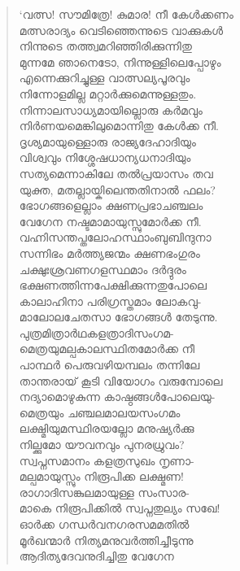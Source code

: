 \begin{verse}
‘വത്സ! സൗമിത്രേ! കുമാര! നീ കേള്‍ക്കണം\\
മത്സരാദ്യം വെടിഞ്ഞെന്നുടെ വാക്കുകള്‍\\
നിന്നുടെ തത്ത്വമറിഞ്ഞിരിക്കുന്നിതു\\
മുന്നമേ ഞാനെടോ, നിന്നുള്ളിലെപ്പോഴും\\
എന്നെക്കുറിച്ചുള്ള വാത്സല്യപൂരവും\\
നിന്നോളമില്ല മറ്റാര്‍ക്കുമെന്നുള്ളതും.\\
നിന്നാലസാധ്യമായില്ലൊരു കര്‍മവും\\
നിര്‍ണയമെങ്കിലുമൊന്നിതു കേള്‍ക്ക നീ.\\
ദൃശ്യമായുള്ളൊരു രാജ്യദേഹാദിയും\\
വിശ്വവും നിശ്ശേഷധാന്യധനാദിയും\\
സത്യമെന്നാകിലേ തല്‍പ്രയാസം തവ\\
യുക്ത, മതല്ലായ്കിലെന്തതിനാല്‍ ഫലം?\\
ഭോഗങ്ങളെല്ലാം ക്ഷണപ്രഭാചഞ്ചലം\\
വേഗേന നഷ്ടമാമായുസ്സുമോര്‍ക്ക നീ.\\
വഹ്നിസന്തപ്തലോഹസ്ഥാംബുബിന്ദുനാ\\
സന്നിഭം മര്‍ത്ത്യജന്മം ക്ഷണഭംഗുരം\\
ചക്ഷുഃശ്രവണഗളസ്ഥമാം ദര്‍ദ്ദുരം\\
ഭക്ഷണത്തിന്നപേക്ഷിക്കുന്നതുപോലെ\\
കാലാഹിനാ പരിഗ്രസ്തമാം ലോകവു-\\
മാലോലചേതസാ ഭോഗങ്ങള്‍ തേടുന്നു.\\
പുത്രമിത്രാര്‍ഥകളത്രാദിസംഗമ-\\
മെത്രയുമല്പകാലസ്ഥിതമോര്‍ക്ക നീ\\
പാന്ഥര്‍ പെരുവഴിയമ്പലം തന്നിലേ\\
താന്തരായ് കൂടി വിയോഗം വരുമ്പോലെ\\
നദ്യാമൊഴുകുന്ന കാഷ്ഠങ്ങള്‍പോലെയു-\\
മെത്രയും ചഞ്ചലമാലയസംഗമം\\
ലക്ഷ്മിയുമസ്ഥിരയല്ലോ മനുഷ്യര്‍ക്കു\\
നില്ക്കുമോ യൗവനവും പുനരധ്രുവം?\\
സ്വപ്നസമാനം കളത്രസുഖം നൃണാ-\\
മല്പമായുസ്സും നിരൂപിക്ക ലക്ഷ്മണ!\\
രാഗാദിസങ്കുലമായുള്ള സംസാര-\\
മാകെ നിരൂപിക്കില്‍ സ്വപ്നതുല്യം സഖേ!\\
ഓര്‍ക്ക ഗന്ധര്‍വനഗരസമമതില്‍\\
മൂര്‍ഖന്മാര്‍ നിത്യമനുവര്‍ത്തിച്ചീടുന്നു\\
ആദിത്യദേവനുദിച്ചിതു വേഗേന\\

\end{verse}
